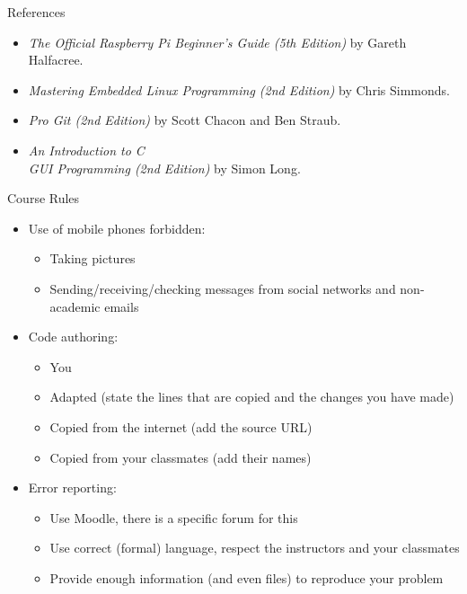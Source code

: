 \begin{frame}{References}
  \begin{itemize}
    \item \textit{The Official Raspberry Pi Beginner’s Guide (5th Edition)} by Gareth Halfacree.
    \item \textit{Mastering Embedded Linux Programming (2nd Edition)} by Chris Simmonds.
    \item \textit{Pro Git (2nd Edition)} by Scott Chacon and Ben Straub.
    \item \textit{An Introduction to C \\ GUI Programming (2nd Edition)} by Simon Long.
  \end{itemize}
\end{frame}

\begin{frame}{Course Rules}
\begin{itemize}
    \item Use of mobile phones forbidden:
    \begin{itemize}
        \item Taking pictures
        \item Sending/receiving/checking messages from social networks and non-academic emails
    \end{itemize}
    \item Code authoring:
    \begin{itemize}
        \item You
        \item Adapted (state the lines that are copied and the changes you have made)
        \item Copied from the internet (add the source URL)
        \item Copied from your classmates (add their names)
    \end{itemize}
    \item Error reporting:
    \begin{itemize}
        \item Use Moodle, there is a specific forum for this
        \item Use correct (formal) language, respect the instructors and your classmates
        \item Provide enough information (and even files) to reproduce your problem
    \end{itemize}
\end{itemize}
\end{frame}
